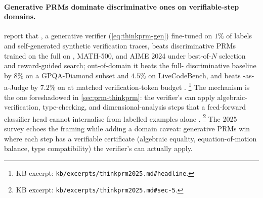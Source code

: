 \paragraph{Generative PRMs dominate discriminative ones on
verifiable-step domains.}  report that , a
generative verifier (\cref{eq:thinkprm-gen}) fine-tuned on $1\%$ of
 labels and self-generated synthetic verification traces,
beats discriminative PRMs trained on the full  on ,
MATH-500, and AIME 2024 under best-of-$N$ selection and reward-guided
search; out-of-domain it beats the full- discriminative baseline
by $8\%$ on a GPQA-Diamond subset and $4.5\%$ on
LiveCodeBench, and beats -as-a-Judge by $7.2\%$ on  at
matched verification-token budget \citep[abstract]{thinkprm2025}.%
\footnote{KB excerpt: \texttt{kb/excerpts/thinkprm2025.md\#headline}.}
The mechanism is the one foreshadowed in \cref{sec:prm-thinkprm}: the
verifier's  can apply algebraic-verification, type-checking, and
dimensional-analysis steps that a feed-forward classifier head cannot
internalise from labelled examples alone \citep[\S 5]{thinkprm2025}.%
\footnote{KB excerpt: \texttt{kb/excerpts/thinkprm2025.md\#sec-5}.} The
2025  survey \citep{zheng2025-prm-survey} echoes the framing while
adding a domain caveat: generative PRMs win where each step has a
verifiable certificate (algebraic equality, equation-of-motion balance,
type compatibility) the verifier's  can actually
apply.

